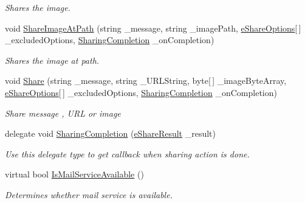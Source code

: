 \begin{DoxyCompactItemize}
\begin{DoxyCompactList}\small\item\em Shares the image. \end{DoxyCompactList}\item 
void \hyperlink{class_voxel_busters_1_1_native_plugins_1_1_sharing_a24968208e8fc70ce2cb1e2a5c7226166}{Share\+Image\+At\+Path} (string \+\_\+message, string \+\_\+image\+Path, \hyperlink{namespace_voxel_busters_1_1_native_plugins_a96ecd12080e18bce52fed6a15bee7367}{e\+Share\+Options}\mbox{[}$\,$\mbox{]} \+\_\+excluded\+Options, \hyperlink{class_voxel_busters_1_1_native_plugins_1_1_sharing_a61017c6d51721d2ca6154ffef15a6555}{Sharing\+Completion} \+\_\+on\+Completion)
\begin{DoxyCompactList}\small\item\em Shares the image at path. \end{DoxyCompactList}\item 
void \hyperlink{class_voxel_busters_1_1_native_plugins_1_1_sharing_a3818a27b9dba216cbcbe749d03a1cfec}{Share} (string \+\_\+message, string \+\_\+\+U\+R\+L\+String, byte\mbox{[}$\,$\mbox{]} \+\_\+image\+Byte\+Array, \hyperlink{namespace_voxel_busters_1_1_native_plugins_a96ecd12080e18bce52fed6a15bee7367}{e\+Share\+Options}\mbox{[}$\,$\mbox{]} \+\_\+excluded\+Options, \hyperlink{class_voxel_busters_1_1_native_plugins_1_1_sharing_a61017c6d51721d2ca6154ffef15a6555}{Sharing\+Completion} \+\_\+on\+Completion)
\begin{DoxyCompactList}\small\item\em Share message , U\+R\+L or image \end{DoxyCompactList}\item 
delegate void \hyperlink{class_voxel_busters_1_1_native_plugins_1_1_sharing_a61017c6d51721d2ca6154ffef15a6555}{Sharing\+Completion} (\hyperlink{namespace_voxel_busters_1_1_native_plugins_ac2d9045086d3df4f9c057613fe7702dd}{e\+Share\+Result} \+\_\+result)
\begin{DoxyCompactList}\small\item\em Use this delegate type to get callback when sharing action is done. \end{DoxyCompactList}\item 
virtual bool \hyperlink{class_voxel_busters_1_1_native_plugins_1_1_sharing_a11331ae5597cbc82719936e8f37fbd1e}{Is\+Mail\+Service\+Available} ()
\begin{DoxyCompactList}\small\item\em Determines whether mail service is available. \end{DoxyCompactList}\item 

\end{DoxyCompactItemize}
